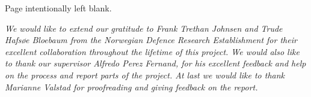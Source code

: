 \vspace*{\fill}
\begin{center}
Page intentionally left blank.
\end{center}
\vspace*{\fill}

\pagebreak

\vspace*{7cm}
\begin{center}

\emph{We would like to extend our gratitude to Frank Trethan Johnsen and Trude Hafsøe Bloebaum from the Norwegian Defence Research Establishment for their excellent collaboration throughout the lifetime of this project. We would also like to thank our supervisor Alfredo Perez Fernand, for his excellent feedback and help on the process and report parts of the project. At last we would like to thank Marianne Valstad for proofreading and giving feedback on the report.}

\end{center}